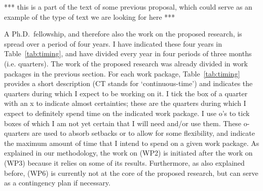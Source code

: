 \documentclass[11pt,dvipsnames,usenames,a4paper]{article}
\begin{document}
{\color{Gray}
*** this is a part of the text of some previous proposal, which could serve as an example of the type of text we are looking for here ***

\begin{table}[H]
    \caption{Summary and time line of work packages}
    \label{tab:timing}
    \centering
\end{table}

A Ph.D.\ fellowship, and therefore also the work on the proposed research, is spread over a period of four years.
I have indicated these four years in Table~\ref{tab:timing}, and have divided every year in four periods of three months (i.e. quarters).
The work of the proposed research was already divided in work packages in the previous section.
For each work package, Table~\ref{tab:timing} provides a short description (CT stands for `continuous-time') and indicates the quarters during which I expect to be working on it.
I tick the box of a quarter with an x to indicate almost certainties; these are the quarters during which I expect to definitely spend time on the indicated work package.
I use o's to tick boxes of which I am not yet certain that I will need and/or use them.
These o-quarters are used to absorb setbacks or to allow for some flexibility, and indicate the maximum amount of time that I intend to spend on a given work package. As explained in our methodology, the work on (WP2) is initiated after the work on (WP3) because it relies on some of its results. Furthermore, as also explained before, (WP6) is currently not at the core of the proposed research, but can serve as a contingency plan if necessary.
}
\end{document}
